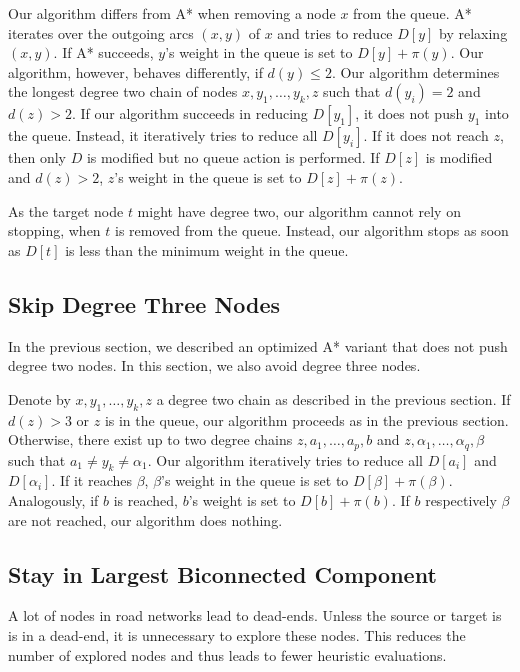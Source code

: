 \documentclass[letterpaper]{article} %
\begin{document}
Our algorithm differs from A* when removing a node $x$ from the queue.
A* iterates over the outgoing arcs $(x,y)$ of $x$ and tries to reduce $D[y]$ by relaxing $(x,y)$.
If A* succeeds, $y$'s weight in the queue is set to $D[y]+\pi(y)$.
Our algorithm, however, behaves differently, if $d(y)\le 2$.
Our algorithm determines the longest degree two chain of nodes $x,y_1,\ldots, y_k, z$ such that $d(y_i)=2$ and $d(z) > 2$.
If our algorithm succeeds in reducing $D[y_1]$, it does not push $y_1$ into the queue.
Instead, it iteratively tries to reduce all $D[y_i]$.
If it does not reach $z$, then only $D$ is modified but no queue action is performed.
If $D[z]$ is modified and $d(z)>2$, $z$'s weight in the queue is set to $D[z]+\pi(z)$.

As the target node $t$ might have degree two, our algorithm cannot rely on stopping, when $t$ is removed from the queue.
Instead, our algorithm stops as soon as $D[t]$ is less than the minimum weight in the queue.

\subsection{Skip Degree Three Nodes}

In the previous section, we described an optimized A* variant that does not push degree two nodes.
In this section, we also avoid degree three nodes.

Denote by $x,y_1,\ldots, y_k, z$ a degree two chain as described in the previous section.
If $d(z) > 3$ or $z$ is in the queue, our algorithm proceeds as in the previous section.
Otherwise, there exist up to two degree chains $z,a_1,\ldots,a_p,b$ and $z,\alpha_1,\ldots,\alpha_q,\beta$ such that $a_1\neq y_k \neq \alpha_1$.
Our algorithm iteratively tries to reduce all $D[a_i]$ and $D[\alpha_i]$.
If it reaches $\beta$, $\beta$'s weight in the queue is set to $D[\beta]+\pi(\beta)$.
Analogously, if $b$ is reached, $b$'s weight is set to $D[b]+\pi(b)$.
If $b$ respectively $\beta$ are not reached, our algorithm does nothing.

\subsection{Stay in Largest Biconnected Component}

\label{sec:largested-biconnected-component}

A lot of nodes in road networks lead to dead-ends.
Unless the source or target is is in a dead-end, it is unnecessary to explore these nodes.
This reduces the number of explored nodes and thus leads to fewer heuristic evaluations.
\end{document}

